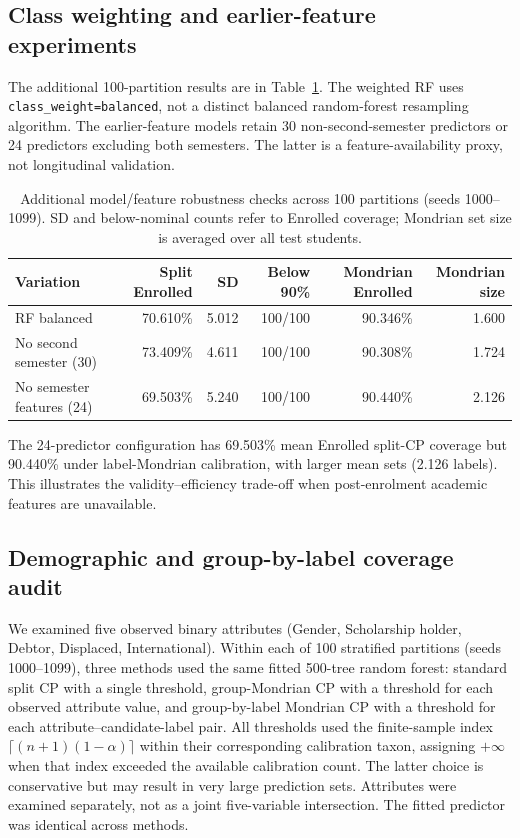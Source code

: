 \subsection{Class weighting and earlier-feature experiments}\label{sec:featurechecks}

The additional 100-partition results are in Table~\ref{tab:features}.
The weighted RF uses \texttt{class\_weight=balanced}, not a distinct balanced
random-forest resampling algorithm. The earlier-feature models retain 30
non-second-semester predictors or 24 predictors excluding both semesters.
The latter is a feature-availability proxy, not longitudinal validation.

\begin{table}[htbp]
\centering\small
\caption{Additional model/feature robustness checks across 100 partitions
(seeds 1000--1099). SD and below-nominal counts refer to Enrolled coverage;
Mondrian set size is averaged over all test students.}
\label{tab:features}
\begin{tabular}{lrrrrr}
\toprule
Variation & Split Enrolled & SD & Below 90\% & Mondrian Enrolled & Mondrian size\\
\midrule
RF balanced & 70.610\% & 5.012 & 100/100 & 90.346\% & 1.600\\
No second semester (30) & 73.409\% & 4.611 & 100/100 & 90.308\% & 1.724\\
No semester features (24) & 69.503\% & 5.240 & 100/100 & 90.440\% & 2.126\\
\bottomrule
\end{tabular}
\end{table}

The 24-predictor configuration has 69.503\% mean Enrolled split-CP coverage
but 90.440\% under label-Mondrian calibration, with larger mean sets
(2.126 labels). This illustrates the validity--efficiency trade-off when
post-enrolment academic features are unavailable.

\subsection{Demographic and group-by-label coverage audit}\label{sec:groups}

We examined five observed binary attributes (Gender, Scholarship holder,
Debtor, Displaced, International). Within each of 100 stratified partitions
(seeds 1000--1099), three methods used the same fitted 500-tree random forest:
standard split CP with a single threshold, group-Mondrian CP with a threshold
for each observed attribute value, and group-by-label Mondrian CP with a
threshold for each attribute--candidate-label pair. All thresholds used the
finite-sample index $\lceil(n+1)(1-\alpha)\rceil$ within their corresponding
calibration taxon, assigning $+\infty$ when that index exceeded the available
calibration count. The latter choice is conservative but may result in very
large prediction sets. Attributes were examined separately, not as a joint
five-variable intersection. The fitted predictor was identical across methods.

